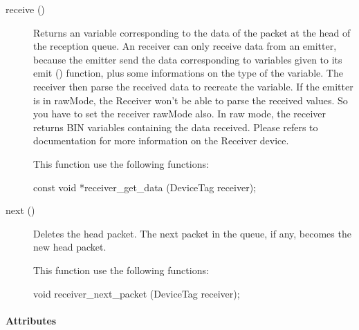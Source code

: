 \noindent
\begin{description}
\item[{receive ()}] Returns an \urbi variable corresponding to the
  data of the packet at the head of the reception queue. An \urbi
  receiver can only receive data from an \urbi emitter, because the
  \urbi emitter send the data corresponding to \urbi variables given
  to its emit () function, plus some informations on the type of the
  variable. The receiver then parse the received data to recreate the
  \urbi variable.  If the \urbi emitter is in rawMode, the Receiver
  won't be able to parse the received values.  So you have to set the
  receiver rawMode also. In raw mode, the receiver returns BIN
  variables containing the data received.  Please refers to \webots
  documentation for more information on the Receiver device.

  This function use the following \webots functions:

\begin{cxx}
const void *receiver_get_data  (DeviceTag receiver);
\end{cxx}

\item[{next ()}] Deletes the head packet. The next packet in the
  queue, if any, becomes the new head packet.

  This function use the following \webots functions:

\begin{cxx}
void receiver_next_packet  (DeviceTag receiver);
\end{cxx}
\end{description}

\paragraph{Attributes}

